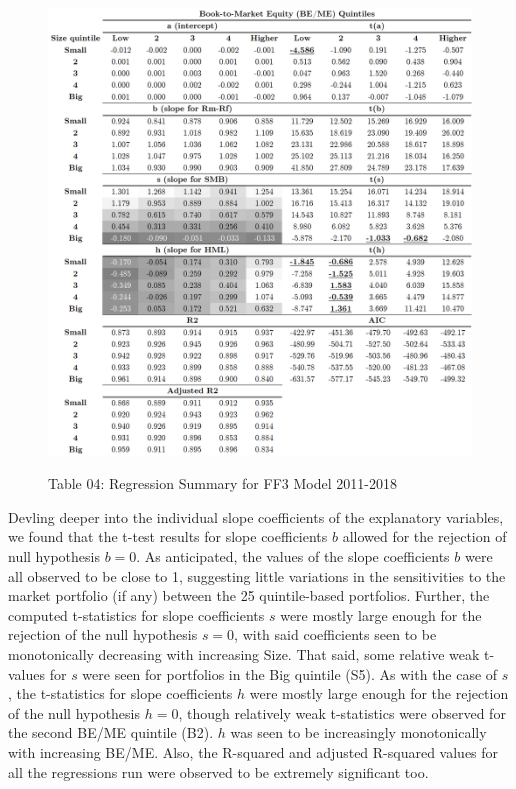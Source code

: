 \documentclass[12pt]{article}
\begin{document}
\begin{figure}[h]
	\centering
	\caption*{Table 04: Regression Summary for FF3 Model 2011-2018}
	\includegraphics[width=0.88\linewidth,trim=4 4 4 4,clip]{A5.png}
	\label{fig:label}
\end{figure}

\noindent Devling deeper into the individual slope coefficients of the explanatory variables, we found that the t-test results for slope coefficients $b$ allowed for the rejection of null hypothesis $b=0$. As anticipated, the values of the slope coefficients $b$ were all observed to be close to 1, suggesting little variations in the sensitivities to the market portfolio (if any) between the 25 quintile-based portfolios. Further, the computed t-statistics for slope coefficients $s$ were mostly large enough for the rejection of the null hypothesis $s=0$, with said coefficients seen to be monotonically decreasing with increasing Size. That said, some relative weak t-values for $s$ were seen for portfolios in the Big quintile (S5). As with the case of $s$, the t-statistics for slope coefficients $h$ were mostly large enough for the rejection of the null hypothesis $h=0$, though relatively weak t-statistics were observed for the second BE/ME quintile (B2). $h$ was seen to be increasingly monotonically with increasing BE/ME. Also, the R-squared and adjusted R-squared values for all the regressions run were observed to be extremely significant too.\\
\end{document}
